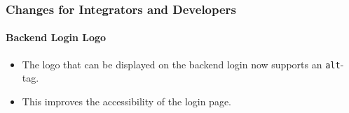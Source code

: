 %

\begin{frame}[fragile]
	\frametitle{Changes for Integrators and Developers}
	\framesubtitle{Backend Login Logo}


	\begin{itemize}
		\item The logo that can be displayed on the backend login now supports
			an \texttt{alt}-tag.
		\item This improves the accessibility of the login page.
	\end{itemize}


\end{frame}

